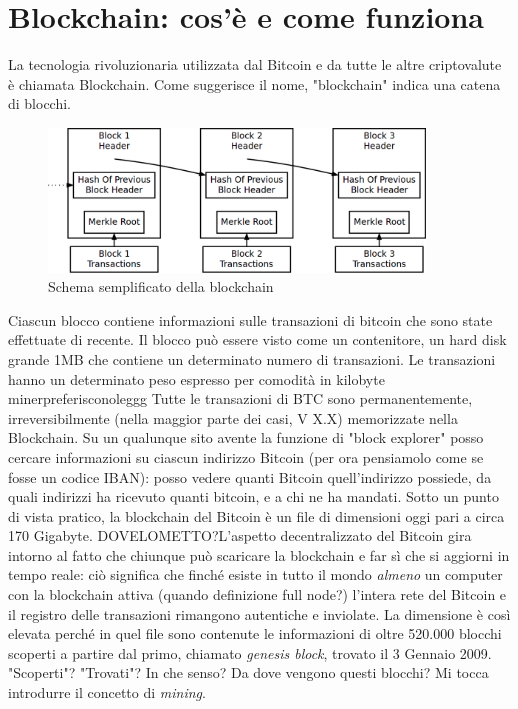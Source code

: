 \documentclass {article}
\begin{document}
\section {Blockchain: cos'è e come funziona}


La tecnologia rivoluzionaria utilizzata dal Bitcoin e da tutte le altre criptovalute è chiamata Blockchain.
Come suggerisce il nome, "blockchain" indica una catena di blocchi.

\vspace {0.5cm}
\begin {figure}[h]
\includegraphics [width = 10cm] {blockchain2.png}
\caption {Schema semplificato della blockchain}
\end {figure}
\vspace {0.5cm}
%
Ciascun blocco contiene informazioni sulle transazioni di bitcoin che sono state effettuate di recente.
Il blocco può essere visto come un contenitore, un hard disk grande 1MB che contiene un determinato numero di transazioni.
Le transazioni hanno un determinato peso espresso per comodità in kilobyte minerpreferisconoleggg
Tutte le transazioni di BTC sono permanentemente, irreversibilmente (nella maggior parte dei casi, V X.X) memorizzate nella Blockchain.
Su un qualunque sito avente la funzione di "block explorer" posso cercare informazioni su ciascun indirizzo Bitcoin (per ora pensiamolo come se fosse un codice IBAN): posso vedere quanti Bitcoin quell'indirizzo possiede, da quali indirizzi ha ricevuto quanti bitcoin, e a chi ne ha mandati.
Sotto un punto di vista pratico, la blockchain del Bitcoin è un file di dimensioni oggi pari a circa 170 Gigabyte.
DOVELOMETTO?L'aspetto decentralizzato del Bitcoin gira intorno al fatto che chiunque può scaricare la blockchain e far sì che si aggiorni in tempo reale: ciò significa che finché esiste in tutto il mondo \emph{almeno} un computer con la blockchain attiva (quando definizione full node?) l'intera rete del Bitcoin e il registro delle transazioni rimangono autentiche e inviolate.
La dimensione è così elevata perché in quel file sono contenute le informazioni di oltre 520.000 blocchi scoperti a partire dal primo, chiamato \textit{genesis block}, trovato il 3 Gennaio 2009.
"Scoperti"? "Trovati"? In che senso? Da dove vengono questi blocchi? Mi tocca introdurre il concetto di \textit{mining}.
\end{document}
